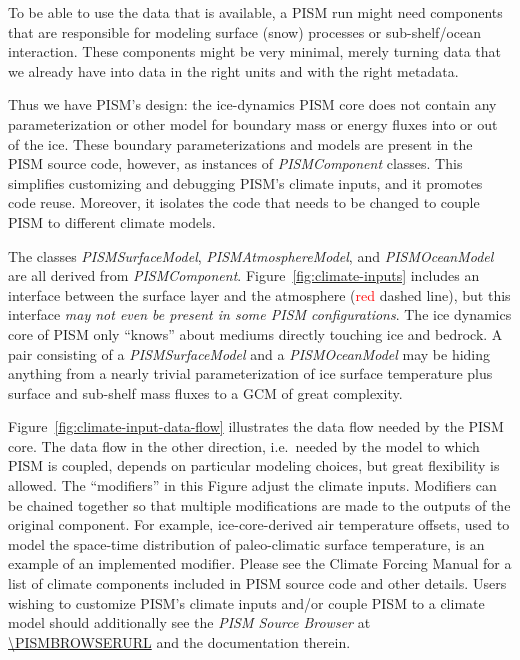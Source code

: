 To be able to use the data that is available, a PISM run might need components that are responsible for modeling surface (snow) processes or sub-shelf/ocean interaction.  These components might be very minimal, merely turning data that we already have into data in the right units and with the right metadata.

Thus we have PISM's design: the ice-dynamics PISM core does not contain any parameterization or other model for boundary mass or energy fluxes into or out of the ice.  These boundary parameterizations and models are present in the PISM source code, however, as instances of \emph{PISMComponent} classes.  This simplifies customizing and debugging PISM's climate inputs, and it promotes code reuse.  Moreover, it isolates the code that needs to be changed to couple PISM to different climate models.

The classes \mbox{\emph{PISMSurfaceModel}}, \mbox{\emph{PISMAtmosphereModel}}, and \mbox{\emph{PISMOceanModel}} are all derived from \mbox{\emph{PISMComponent}}.  Figure~\ref{fig:climate-inputs} includes an interface between the surface layer and the atmosphere (\textcolor{red}{red} dashed line), but this interface \emph{may not even be present in some PISM configurations}.  The ice dynamics core of PISM only ``knows'' about mediums directly touching ice and bedrock.  A pair consisting of a \emph{PISMSurfaceModel} and a \emph{PISMOceanModel} may be hiding anything from a nearly trivial parameterization of ice surface temperature plus surface and sub-shelf mass fluxes to a GCM of great complexity.  

Figure~\ref{fig:climate-input-data-flow} illustrates the data flow needed
by the PISM core.  The data flow in the other direction, i.e.~needed by the
model to which PISM is coupled, depends on particular modeling choices, but
great flexibility is allowed.  The ``modifiers'' in this Figure adjust the
climate inputs.  Modifiers can be chained together so that multiple modifications
are made to the outputs of the original component.  For example,
ice-core-derived air temperature offsets, used to model the space-time
distribution of paleo-climatic surface temperature, is an example of an
implemented modifier.  Please see the Climate Forcing Manual for
a list of climate components included in PISM source code and other details.
Users wishing to customize PISM's climate inputs and/or couple PISM to a climate
model should additionally see the \emph{PISM Source Browser} at \url{\PISMBROWSERURL}
and the documentation therein.

